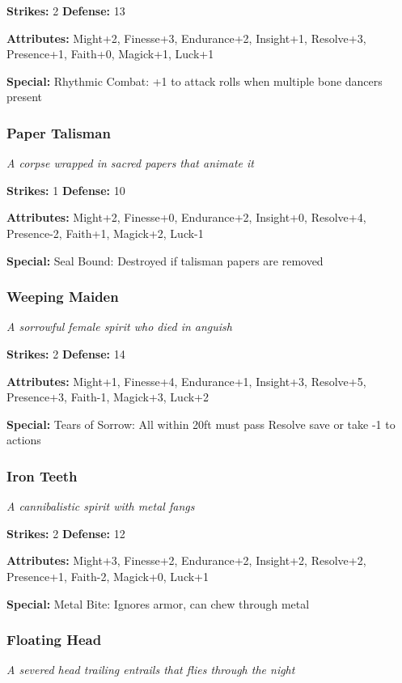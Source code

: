 \documentclass[10pt,twoside]{article}
\begin{document}
\textbf{Strikes:} 2 \quad \textbf{Defense:} 13

\textbf{Attributes:} Might+2, Finesse+3, Endurance+2, Insight+1, Resolve+3, Presence+1, Faith+0, Magick+1, Luck+1

\textbf{Special:} Rhythmic Combat: +1 to attack rolls when multiple bone dancers present

\subsubsection{Paper Talisman}
\textit{A corpse wrapped in sacred papers that animate it}

\textbf{Strikes:} 1 \quad \textbf{Defense:} 10

\textbf{Attributes:} Might+2, Finesse+0, Endurance+2, Insight+0, Resolve+4, Presence-2, Faith+1, Magick+2, Luck-1

\textbf{Special:} Seal Bound: Destroyed if talisman papers are removed

\subsubsection{Weeping Maiden}
\textit{A sorrowful female spirit who died in anguish}

\textbf{Strikes:} 2 \quad \textbf{Defense:} 14

\textbf{Attributes:} Might+1, Finesse+4, Endurance+1, Insight+3, Resolve+5, Presence+3, Faith-1, Magick+3, Luck+2

\textbf{Special:} Tears of Sorrow: All within 20ft must pass Resolve save or take -1 to actions

\subsubsection{Iron Teeth}
\textit{A cannibalistic spirit with metal fangs}

\textbf{Strikes:} 2 \quad \textbf{Defense:} 12

\textbf{Attributes:} Might+3, Finesse+2, Endurance+2, Insight+2, Resolve+2, Presence+1, Faith-2, Magick+0, Luck+1

\textbf{Special:} Metal Bite: Ignores armor, can chew through metal

\subsubsection{Floating Head}
\textit{A severed head trailing entrails that flies through the night}
\end{document}

